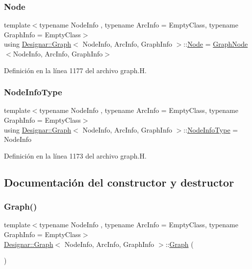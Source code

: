 \subsubsection{\texorpdfstring{Node}{Node}}
{\footnotesize\ttfamily template$<$typename Node\+Info , typename Arc\+Info  = Empty\+Class, typename Graph\+Info  = Empty\+Class$>$ \\
using \hyperlink{class_designar_1_1_graph}{Designar\+::\+Graph}$<$ Node\+Info, Arc\+Info, Graph\+Info $>$\+::\hyperlink{class_designar_1_1_graph_a5dfc7dba9d092ac489c72e40390c37d0}{Node} =  \hyperlink{class_designar_1_1_graph_node}{Graph\+Node}$<$Node\+Info, Arc\+Info, Graph\+Info$>$}



Definición en la línea 1177 del archivo graph.\+H.

\mbox{\label{class_designar_1_1_graph_a31ac58ee9562d1695e63449318577032}} 
\subsubsection{\texorpdfstring{Node\+Info\+Type}{NodeInfoType}}
{\footnotesize\ttfamily template$<$typename Node\+Info , typename Arc\+Info  = Empty\+Class, typename Graph\+Info  = Empty\+Class$>$ \\
using \hyperlink{class_designar_1_1_graph}{Designar\+::\+Graph}$<$ Node\+Info, Arc\+Info, Graph\+Info $>$\+::\hyperlink{class_designar_1_1_graph_a31ac58ee9562d1695e63449318577032}{Node\+Info\+Type} =  Node\+Info}



Definición en la línea 1173 del archivo graph.\+H.



\subsection{Documentación del constructor y destructor}
\mbox{\label{class_designar_1_1_graph_a606f7514b8036679207da8a09ddfa6bd}} 
\subsubsection{\texorpdfstring{Graph()}{Graph()}\hspace{0.1cm}{\footnotesize\ttfamily [1/5]}}
{\footnotesize\ttfamily template$<$typename Node\+Info , typename Arc\+Info  = Empty\+Class, typename Graph\+Info  = Empty\+Class$>$ \\
\hyperlink{class_designar_1_1_graph}{Designar\+::\+Graph}$<$ Node\+Info, Arc\+Info, Graph\+Info $>$\+::\hyperlink{class_designar_1_1_graph}{Graph} (\begin{DoxyParamCaption}{ }\end{DoxyParamCaption})\hspace{0.3cm}{\ttfamily [inline]}}



